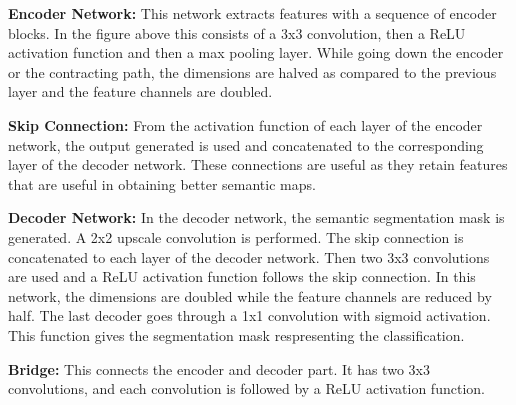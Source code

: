 \documentclass[rnd]{mas_proposal}
\begin{document}
\textbf{Encoder Network:} This network extracts features with a sequence of encoder blocks. In the figure above this consists of a 3x3 convolution, then a ReLU activation function and then a max pooling layer. While going down the encoder or the contracting path, the dimensions are halved as compared to the previous layer and the feature channels are doubled. 

\textbf{Skip Connection:} From the activation function of each layer of the encoder network, the output generated is used and concatenated to the corresponding layer of the decoder network. These connections are useful as they retain features that are useful in obtaining better semantic maps.

\textbf{Decoder Network:} In the decoder network, the semantic segmentation mask is generated. A 2x2 upscale convolution is performed. The skip connection is concatenated to each layer of the decoder network. Then two 3x3 convolutions are used and a ReLU activation function follows the skip connection. In this network, the dimensions are doubled while the feature channels are reduced by half. 
The last decoder goes through a 1x1 convolution with sigmoid activation. This function gives the segmentation mask respresenting the classification.

\textbf{Bridge:} This connects the encoder and decoder part. It has two 3x3 convolutions, and each convolution is followed by a ReLU activation function.




\newpage
 
\end{document}

